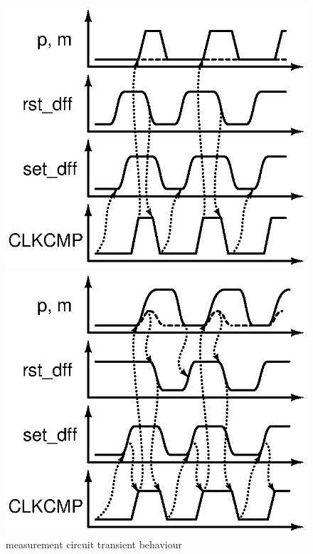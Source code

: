 \begin{figure}[htp]
	\begin{minipage}[b]{0.47\linewidth}
	\includegraphics[width=\linewidth]{Chapter5/Figs/test_delay_comp_new_tare0_bypass1.ps}
	\end{minipage}
	\begin{minipage}[b]{0.47\linewidth}
	\includegraphics[width=\linewidth]{Chapter5/Figs/test_delay_comp_new_tare1_bypass1.ps}
	\end{minipage}
	\caption{measurement circuit transient behaviour}
	\label{fig:meas_circ_trans}
	\vspace{-1em}
\end{figure}

